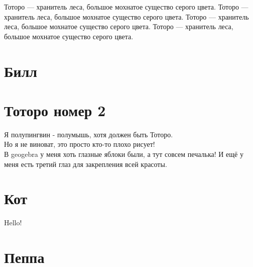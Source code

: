 \documentclass[12pt, a4paper]{article}
\begin{document}
\begin{pleasesay}{Тоторо --- хранитель леса, большое мохнатое существо серого цвета. Тоторо --- хранитель леса, большое мохнатое существо серого цвета. Тоторо --- хранитель леса, большое мохнатое существо серого цвета. Тоторо --- хранитель леса, большое мохнатое существо серого цвета.}
\end{pleasesay}


\newpage 

\section{Билл} 



\newpage

\section{Тоторо номер 2} 

\begin{center}
\begin{totoro}
Я полупингвин - полумышь, хотя должен быть Тоторо.\\
Но я не виноват, это просто кто-то плохо рисует!\\
В geogebra у меня хоть глазные яблоки были, а тут совсем печалька!
И ещё у меня есть третий глаз для закрепления всей красоты.
\end{totoro}
\end{center}



\newpage 


\section{Кот} 

\begin{kot}
{Hello!}
\end{kot}


\newpage 

\section{Пеппа} 
\end{document}
